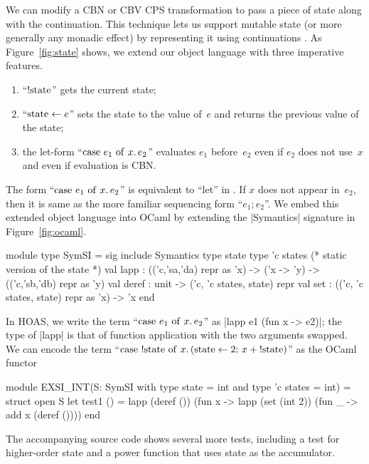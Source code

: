 We can modify a CBN or CBV CPS transformation to pass a piece of state
along with the continuation. This technique lets us support mutable
state (or more generally any monadic effect) by representing it
using continuations \citep{filinski-representing}.
As Figure~\ref{fig:state} shows, we extend our object language
with three imperative features.
\begin{enumerate}
    \item ``$\mathrm{!state}$'' gets the current state;
    \item ``$\mathrm{state}\leftarrow e$'' sets the state to the value of~$e$ and returns
        the previous value of the state;
    \item the let-form ``$\mathrm{case\ }e_1\mathrm{\ of\ }x.\,e_2$'' evaluates $e_1$
        before~$e_2$ even if $e_2$ does not use~$x$ and even if
        evaluation is CBN\@.
\end{enumerate}
The form ``$\mathrm{case\ }e_1\mathrm{\ of\ }x.\,e_2$'' is equivalent to
``let'' in \citet{moggi-notions}.
If $x$ does not appear in~$e_2$, then it is same as
the more familiar sequencing form ``$e_1;e_2$''.
We embed this extended object language into OCaml by extending the
|Symantics| signature in Figure~\ref{fig:ocaml}.
\begin{code}
module type SymSI = sig
  include Symantics
  type state
  type 'c states       (* static version of the state *)
  val lapp : (('c,'sa,'da) repr as 'x) -> ('x -> 'y)
             -> (('c,'sb,'db) repr as 'y)
  val deref : unit -> ('c, 'c states, state) repr
  val set   : (('c, 'c states, state) repr as 'x) -> 'x
end
\end{code}
In HOAS\@, we write the term ``$\mathrm{case\ }e_1\mathrm{\ of\ }x.\,e_2$'' as |lapp e1 (fun x -> e2)|;
the type of |lapp| is that of function application with
the two arguments swapped.  We can encode the term
``$\mathrm{case\ }\mathrm{!state}\mathrm{\ of\ }x.\, (\mathrm{state}\leftarrow 2;\, x+\mathrm{!state})$''
as the OCaml functor
\begin{code}
module EXSI_INT(S: SymSI
  with type state = int and type 'c states = int) = struct open S
  let test1 () = lapp (deref ()) (fun x -> 
                  lapp (set (int 2)) (fun _ -> add x (deref ())))
end
\end{code}
The accompanying source code shows several more tests, including
a test for higher-order state and a power function that uses state
as the accumulator.

